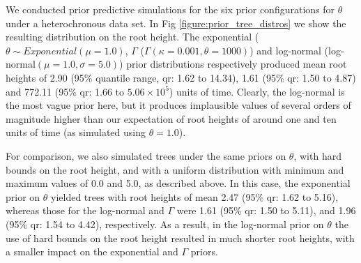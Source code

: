 \documentclass[10pt,letterpaper]{article}
\begin{document}
We conducted prior predictive simulations for the six prior configurations for $\theta$ under a heterochronous data set. In Fig \ref{figure:prior_tree_distros} we show the resulting distribution on the root height. The exponential ($\theta \sim Exponential(\mu=1.0)$, $\Gamma$ ($\Gamma(\kappa=0.001, \theta=1000)$) and log-normal (log-normal$(\mu=1.0, \sigma=5.0)$) prior distributions respectively produced mean root heights of 2.90 (95\% quantile range, qr: 1.62 to 14.34), 1.61 (95\% qr: 1.50 to 4.87) and 772.11 (95\% qr: 1.66 to $5.06 \times 10^5$) units of time. Clearly, the log-normal is the most vague prior here, but it produces implausible values of several orders of magnitude higher than our expectation of root heights of around one and ten units of time (as simulated using $\theta=1.0$).

For comparison, we also simulated trees under the same priors on $\theta$, with hard bounds on the root height, and with a uniform distribution with minimum and maximum values of 0.0 and 5.0, as described above. In this case, the exponential prior on $\theta$ yielded trees with root heights of mean 2.47 (95\% qr: 1.62 to 5.16), whereas those for the log-normal and $\Gamma$ were 1.61 (95\% qr: 1.50 to 5.11), and 1.96 (95\% qr: 1.54 to 4.42), respectively. As a result, in the log-normal prior on $\theta$ the use of hard bounds on the root height resulted in much shorter root heights, with a smaller impact on the exponential and $\Gamma$ priors.
\end{document}
